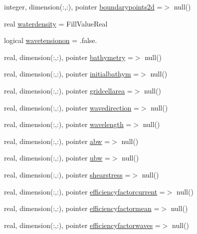 \begin{DoxyCompactItemize}
\item 
integer, dimension(\+:,\+:), pointer \mbox{\hyperlink{structmodulesediment_1_1t__external_a95d1bf6fe8aff3e6b4ee29d54f2dfad2}{boundarypoints2d}} =$>$ null()
\item 
real \mbox{\hyperlink{structmodulesediment_1_1t__external_a14beb2fa8827bdccfbb8c8de42cac0c1}{waterdensity}} = Fill\+Value\+Real
\item 
logical \mbox{\hyperlink{structmodulesediment_1_1t__external_add86315e15f690dc95eeaa9f189bfc50}{wavetensionon}} = .false.
\item 
real, dimension(\+:,\+:), pointer \mbox{\hyperlink{structmodulesediment_1_1t__external_a6f2f510ee1e35ecb1da48fe164f78536}{bathymetry}} =$>$ null()
\item 
real, dimension(\+:,\+:), pointer \mbox{\hyperlink{structmodulesediment_1_1t__external_af16d1845115fb5069882df14dd6de499}{initialbathym}} =$>$ null()
\item 
real, dimension(\+:,\+:), pointer \mbox{\hyperlink{structmodulesediment_1_1t__external_aa4b9e5fe8faedf56fb957398e2cca60d}{gridcellarea}} =$>$ null()
\item 
real, dimension(\+:,\+:), pointer \mbox{\hyperlink{structmodulesediment_1_1t__external_a2ad21376ca514492a914e9c4603383e6}{wavedirection}} =$>$ null()
\item 
real, dimension(\+:,\+:), pointer \mbox{\hyperlink{structmodulesediment_1_1t__external_ae6a0fbb5c51550eddeb058192d1e87a6}{wavelength}} =$>$ null()
\item 
real, dimension(\+:,\+:), pointer \mbox{\hyperlink{structmodulesediment_1_1t__external_a99a4fbef80a3a580188a34ce769552fe}{abw}} =$>$ null()
\item 
real, dimension(\+:,\+:), pointer \mbox{\hyperlink{structmodulesediment_1_1t__external_af5b23301f6268c464579af69065c4a81}{ubw}} =$>$ null()
\item 
real, dimension(\+:,\+:), pointer \mbox{\hyperlink{structmodulesediment_1_1t__external_a6c3db7bb01cbb1c1bfd88e1d639f6278}{shearstress}} =$>$ null()
\item 
real, dimension(\+:,\+:), pointer \mbox{\hyperlink{structmodulesediment_1_1t__external_a46fb5a0317798b72997050d58258ab43}{efficiencyfactorcurrent}} =$>$ null()
\item 
real, dimension(\+:,\+:), pointer \mbox{\hyperlink{structmodulesediment_1_1t__external_aab40e4ed79c6c4cff826c41612e35f64}{efficiencyfactormean}} =$>$ null()
\item 
real, dimension(\+:,\+:), pointer \mbox{\hyperlink{structmodulesediment_1_1t__external_add0b5b28357b54d028088b6bb27bda9f}{efficiencyfactorwaves}} =$>$ null()

\end{DoxyCompactItemize}
